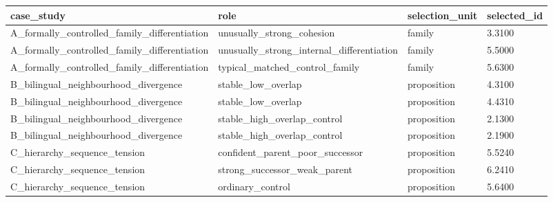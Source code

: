 \begin{tabular}{llll}
 \hline
case\_study & role & selection\_unit & selected\_id \\
 \hline
A\_formally\_controlled\_family\_differentiation & unusually\_strong\_cohesion & family & 3.3100 \\
A\_formally\_controlled\_family\_differentiation & unusually\_strong\_internal\_differentiation & family & 5.5000 \\
A\_formally\_controlled\_family\_differentiation & typical\_matched\_control\_family & family & 5.6300 \\
B\_bilingual\_neighbourhood\_divergence & stable\_low\_overlap & proposition & 4.3100 \\
B\_bilingual\_neighbourhood\_divergence & stable\_low\_overlap & proposition & 4.4310 \\
B\_bilingual\_neighbourhood\_divergence & stable\_high\_overlap\_control & proposition & 2.1300 \\
B\_bilingual\_neighbourhood\_divergence & stable\_high\_overlap\_control & proposition & 2.1900 \\
C\_hierarchy\_sequence\_tension & confident\_parent\_poor\_successor & proposition & 5.5240 \\
C\_hierarchy\_sequence\_tension & strong\_successor\_weak\_parent & proposition & 6.2410 \\
C\_hierarchy\_sequence\_tension & ordinary\_control & proposition & 5.6400 \\
 \hline
\end{tabular}
